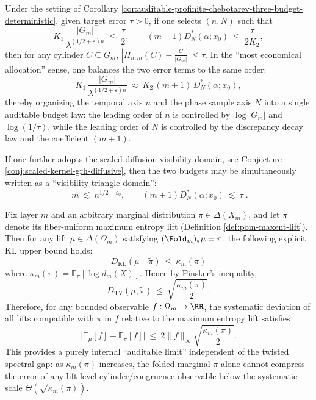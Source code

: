 \begin{corollary}\label{cor:auditable-profinite-chebotarev-balance-triangle}
Under the setting of Corollary \ref{cor:auditable-profinite-chebotarev-three-budget-deterministic}, given target error \(\tau>0\), if one selects \((n,N)\) such that
\[
K_1\,\frac{|G_m|}{\lambda^{(1/2+\varepsilon)n}}\ \le\ \frac{\tau}{2},
\qquad
(m+1)D_N^*(\alpha;x_0)\ \le\ \frac{\tau}{2K_2},
\]
then for any cylinder \(C\subseteq G_m\),
\(
\left|\Pi_{n,m}(C)-\frac{|C|}{|G_m|}\right|\le \tau
\).
In the ``most economical allocation'' sense, one balances the two error terms to the same order:
\[
K_1\,\frac{|G_m|}{\lambda^{(1/2+\varepsilon)n}}
\ \approx\
K_2\,(m+1)\,D_N^*(\alpha;x_0),
\]
thereby organizing the temporal axis \(n\) and the phase sample axis \(N\) into a single auditable budget law: the leading order of \(n\) is controlled by \(\log|G_m|\) and \(\log(1/\tau)\), while the leading order of \(N\) is controlled by the discrepancy decay law and the coefficient \((m+1)\).
\par
If one further adopts the scaled-diffusion visibility domain, see Conjecture \ref{conj:scaled-kernel-grh-diffusive}, then the two budgets may be simultaneously written as a ``visibility triangle domain'':
\[
\boxed{\;
m\ \lesssim\ n^{1/2-\varepsilon_0},
\qquad
(m+1)D_N^*(\alpha;x_0)\ \lesssim\ \tau\; }.
\]
\end{corollary}

\begin{theorem}\label{thm:defect-limited-audit}
Fix layer \(m\) and an arbitrary marginal distribution \(\pi\in\Delta(X_m)\), and let \(\widetilde\pi\) denote its fiber-uniform maximum entropy lift (Definition \ref{def:pom-maxent-lift}).
Then for any lift \(\mu\in\Delta(\Omega_m)\) satisfying \((\Fold_m)_*\mu=\pi\), the following explicit KL upper bound holds:
\[
\boxed{\;
D_{\mathrm{KL}}(\mu\|\widetilde\pi)\ \le\ \kappa_m(\pi)
\;}
\]
where \(\kappa_m(\pi)=\mathbb{E}_\pi[\log d_m(X)]\).
Hence by Pinsker's inequality,
\[
\boxed{\;
D_{\mathrm{TV}}(\mu,\widetilde\pi)\ \le\ \sqrt{\frac{\kappa_m(\pi)}{2}}.
\;}
\]
Therefore, for any bounded observable \(f:\Omega_m\to\RR\), the systematic deviation of all lifts compatible with \(\pi\) in \(f\) relative to the maximum entropy lift satisfies
\[
\boxed{\;
\bigl|\mathbb{E}_\mu[f]-\mathbb{E}_{\widetilde\pi}[f]\bigr|
\ \le\ 2\|f\|_\infty\sqrt{\frac{\kappa_m(\pi)}{2}}.
\;}
\]
This provides a purely internal ``auditable limit'' independent of the twisted spectral gap: as \(\kappa_m(\pi)\) increases, the folded marginal \(\pi\) alone cannot compress the error of any lift-level cylinder/congruence observable below the systematic scale \(\Theta(\sqrt{\kappa_m(\pi)})\).
\end{theorem}

